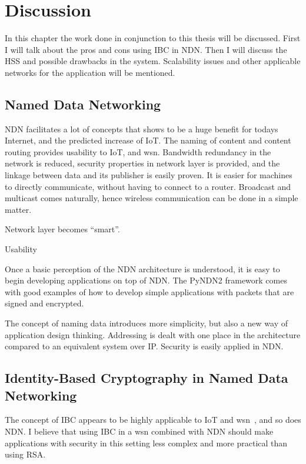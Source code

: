 \chapter{Discussion}
In this chapter the work done in conjunction to this thesis will be discussed. 
First I will talk about the pros and cons using \gls{IBC} in \gls{NDN}.
Then I will discuss the \gls{HSS} and possible drawbacks in the system. 
Scalability issues and other applicable networks for the application will be mentioned.

\section{Named Data Networking}
\gls{NDN} facilitates a lot of concepts that shows to be a huge benefit for todays Internet, and the predicted increase of \gls{IoT}.
The naming of content and content routing provides usability to \gls{IoT}, and \gls{wsn}.
Bandwidth redundancy in the network is reduced, security properties in network layer is provided, and the linkage between data and its publisher is easily proven. 
It is easier for machines to directly communicate, without having to connect to a router.
Broadcast and multicast comes naturally, hence wireless communication can be done in a simple matter.

Network layer becomes ``smart''. 

Usability

Once a basic perception of the \gls{NDN} architecture is understood, it is easy to begin developing applications on top of \gls{NDN}.
The \gls{PyNDN2} framework comes with good examples of how to develop simple applications with packets that are signed and encrypted.

The concept of naming \gls{data} introduces more simplicity, but also a new way of application design thinking.
Addressing is dealt with one place in the architecture compared to an equivalent system over \gls{IP}. 
Security is easily applied in \gls{NDN}.


\section{Identity-Based Cryptography in Named Data Networking}
The concept of \gls{IBC} appears to be highly applicable to \gls{IoT} and \gls{wsn}~\cite{Patil:2012:SWS:2464778}, and so does \gls{NDN}. 
I believe that using \gls{IBC} in a \gls{wsn} combined with \gls{NDN} should make applications with security in this setting less complex and more practical than using RSA. 

